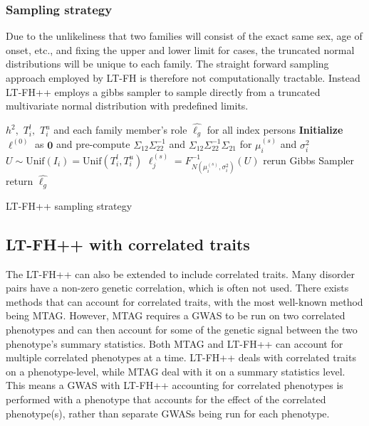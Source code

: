 \subsubsection{Sampling strategy}

Due to the unlikeliness that two families will consist of the exact same sex, age of onset, etc., and fixing the upper and lower limit for cases, the truncated normal distributions will be unique to each family. The straight forward sampling approach employed by LT-FH is therefore not computationally tractable. Instead LT-FH++ employs a gibbs sampler to sample directly from a truncated multivariate normal distribution with predefined limits. 


\begin{algorithm}
\begin{algorithmic}[1]
\INPUT $ h^2,$ $T_{i}^l,$ $T_{i}^u$ and each family member's role 
\OUTPUT $ \hat{\ell_g} $ for all index persons
\GIBBS
\STATE \textbf{Initialize} $\ell^{(0)}$ as $ \mathbf{0} $ and pre-compute $ \Sigma_{12} \Sigma_{22}^{-1} $ and $ \Sigma_{12} \Sigma_{22}^{-1} \Sigma_{21} $ for $ \mu_i^{(s)} $ and $ \sigma^2_i $
	  
	\STATE $ U \sim \text{Unif}(I_i) = \text{Unif}(T_i^l, T_i^u) $ 
	\STATE $ \ell_j^{(s)} = F^{-1}_{N(\mu_i^{(s)}, \sigma_i^2)}(U) $
	\ENDFOR
\ENDFOR
{}
\STATE rerun Gibbs Sampler
\ELSE
\STATE return  $ \hat{\ell_g} $
\ENDIF
\end{algorithmic}
\caption{LT-FH++ sampling strategy}
\label{alg:LTFH++}
\end{algorithm}


\subsection{LT-FH++ with correlated traits}
The LT-FH++ can also be extended to include correlated traits. Many disorder pairs have a non-zero genetic correlation, which is often not used. There exists methods that can account for correlated traits, with the most well-known method being MTAG. However, MTAG requires a GWAS to be run on two correlated phenotypes and can then account for some of the genetic signal between the two phenotype's summary statistics. Both MTAG and LT-FH++ can account for multiple correlated phenotypes at a time. LT-FH++ deals with correlated traits on a phenotype-level, while MTAG deal with it on a summary statistics level. This means a GWAS with LT-FH++ accounting for correlated phenotypes is performed with a phenotype that accounts for the effect of the correlated phenotype(s), rather than separate GWASs being run for each phenotype. 

